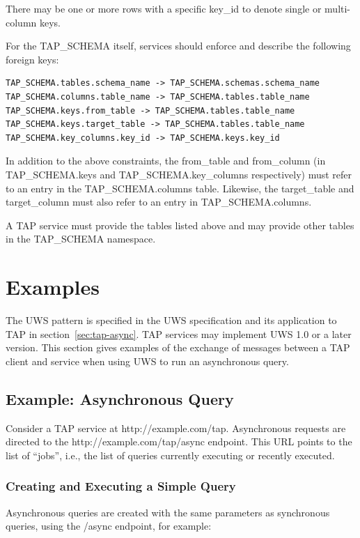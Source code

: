 \documentclass[11pt,letter]{ivoa}
\newcommand{\tapschema}{TAP\_SCHE\-MA}
\newcommand{\tapschema}{\mbox{%
  \relsize{-0.5}TAP\discretionary{-}{}{\kern-2pt\_}SCHEMA}}
\begin{document}
There may be one or more rows with a specific key\_id to denote single or multi-column keys.

For the \tapschema{} itself, services should enforce and describe the following foreign keys:

\begin{verbatim}
TAP_SCHEMA.tables.schema_name -> TAP_SCHEMA.schemas.schema_name
TAP_SCHEMA.columns.table_name -> TAP_SCHEMA.tables.table_name
TAP_SCHEMA.keys.from_table -> TAP_SCHEMA.tables.table_name
TAP_SCHEMA.keys.target_table -> TAP_SCHEMA.tables.table_name
TAP_SCHEMA.key_columns.key_id -> TAP_SCHEMA.keys.key_id
\end{verbatim}

In addition to the above constraints, the from\_table and from\_column (in \tapschema.keys and 
\tapschema.key\_columns respectively) must refer to an entry in the \tapschema.columns table. Likewise, 
the target\_table and target\_column must also refer to an entry in \tapschema.columns.

A TAP service must provide the tables listed above and may provide other tables 
in the \tapschema{} namespace.


\section{Examples}
\label{sec:examples}

The UWS pattern is specified in the UWS specification \citep{2016ivoa.spec.1024H} and its application to TAP in 
section~\ref{sec:tap-async}. TAP services may implement UWS 1.0
or a later version. 
This section gives examples of the exchange of messages between a 
TAP client and service when using UWS to run an asynchronous query.

\subsection{Example: Asynchronous Query}
Consider a TAP service at http://example.com/tap. Asynchronous requests are directed to the http://example.com/tap/async endpoint. This URL points to the list of ``jobs'', i.e., the list of 
queries currently executing or recently executed.

\subsubsection{Creating and Executing a Simple Query}

Asynchronous queries are created with the same parameters as synchronous queries, using the /async endpoint, for example:
\end{document}
